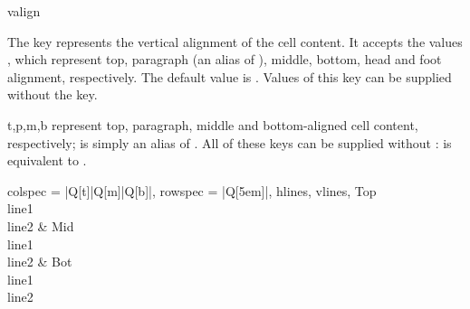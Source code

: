 \begin{codedescribe}[
    key,
    new=2021L
  ]{valign}
  \begin{codesyntax}
  \end{codesyntax}
  The  key represents the vertical alignment of the cell content. It accepts the values , which represent top, paragraph (an alias of ), middle, bottom, head and foot alignment, respectively. The default value is . Values of this key can be supplied without the key.
\end{codedescribe}

\begin{codedescribe}[
    value,
    new=2021B,
    update=2021L
  ]{t,p,m,b}
   represent top, paragraph, middle and bottom-aligned cell content, respectively;  is simply an alias of . All of these keys can be supplied without :  is equivalent to .

  \begin{codestore}[st=columns:tmb]
    \begin{tblr}{
      colspec = {|Q[t]|Q[m]|Q[b]|},
      rowspec = {|Q[5em]|},
      hlines, vlines,
      }
      {Top \\line1\\line2} & {Mid\\line1\\line2} & {Bot\\line1\\line2}
    \end{tblr}\end{codestore}
  \begin{center}
  \end{center}
\end{codedescribe}

